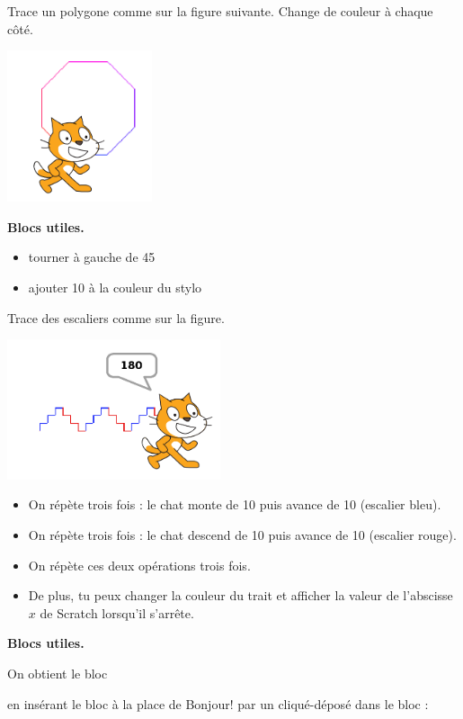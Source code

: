\documentclass[class=report,crop=false, 12pt]{standalone}
\begin{document}
\begin{activite}
Trace un polygone comme sur la figure suivante. Change de couleur à chaque côté. 
\begin{center}
  \includegraphics[width=0.32\textwidth]{ecran-02-ex2}   
\end{center}


\textbf{Blocs utiles.}
\begin{itemize}
  \item \og{}tourner à gauche de 45\textdegree\fg{}
  \item \og{}ajouter 10 à la couleur du stylo\fg{}
\end{itemize}
\end{activite}


\begin{activite}
Trace des escaliers comme sur la figure.
\begin{center}
  \includegraphics[width=0.47\textwidth]{ecran-02-ex3}   
\end{center}

\begin{itemize}
  \item On répète trois fois : le chat monte de 10 puis avance de  10 (escalier bleu).
  \item On répète trois fois  : le chat descend de 10 puis avance de  10  (escalier rouge).
  \item On répète ces deux opérations trois fois.
  \item De plus, tu peux changer la couleur du trait et afficher la valeur de l'abscisse $x$ de Scratch lorsqu'il s'arrête.
\end{itemize}

\bigskip

\textbf{Blocs utiles.}
{
On obtient le bloc 
\begin{scratch}
\end{scratch}
en insérant le bloc  à la place de \og{}Bonjour!\fg{} par un \og{}cliqué-déposé\fg{} dans le bloc : 
\begin{scratch}
\end{scratch}
}

\end{activite}
\end{document}
